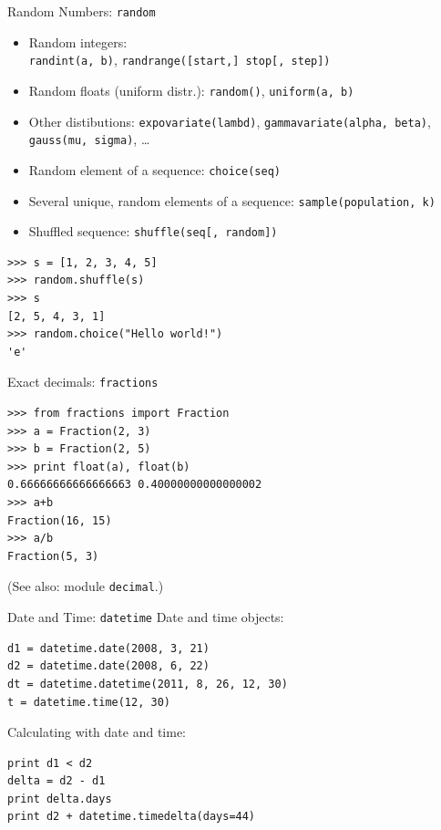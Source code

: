 \begin{frame}[fragile]{Random Numbers: \texttt{random}}
\begin{itemize}
\item Random integers: \\ \texttt{randint(a, b)},  \texttt{randrange([start,] stop[, step])}
\item Random floats (uniform distr.): \texttt{random()}, \texttt{uniform(a, b)}
\item Other distibutions: \texttt{expovariate(lambd)}, \texttt{gammavariate(alpha, beta)}, \texttt{gauss(mu, sigma)}, \dots
\item Random element of a sequence: \texttt{choice(seq)}
\item Several unique, random elements of a sequence: \texttt{sample(population, k)}
\item Shuffled sequence: \texttt{shuffle(seq[, random])}
\end{itemize}
\begin{lstlisting}[style=Python]
>>> s = [1, 2, 3, 4, 5]
>>> random.shuffle(s)
>>> s
[2, 5, 4, 3, 1]
>>> random.choice("Hello world!")
'e'
\end{lstlisting}
\end{frame}


\begin{frame}[fragile]{Exact decimals: \texttt{fractions}}

\begin{lstlisting}
>>> from fractions import Fraction
>>> a = Fraction(2, 3)
>>> b = Fraction(2, 5)
>>> print float(a), float(b)
0.66666666666666663 0.40000000000000002
>>> a+b
Fraction(16, 15)
>>> a/b
Fraction(5, 3)
\end{lstlisting}

(See also: module \texttt{decimal}.)
\end{frame}


\begin{frame}[fragile]{Date and Time: \texttt{datetime}}
Date and time objects:
\begin{lstlisting}
d1 = datetime.date(2008, 3, 21)  
d2 = datetime.date(2008, 6, 22)
dt = datetime.datetime(2011, 8, 26, 12, 30)
t = datetime.time(12, 30)
\end{lstlisting}
Calculating with date and time:
\begin{lstlisting}
print d1 < d2
delta = d2 - d1
print delta.days
print d2 + datetime.timedelta(days=44)
\end{lstlisting}
\end{frame}

